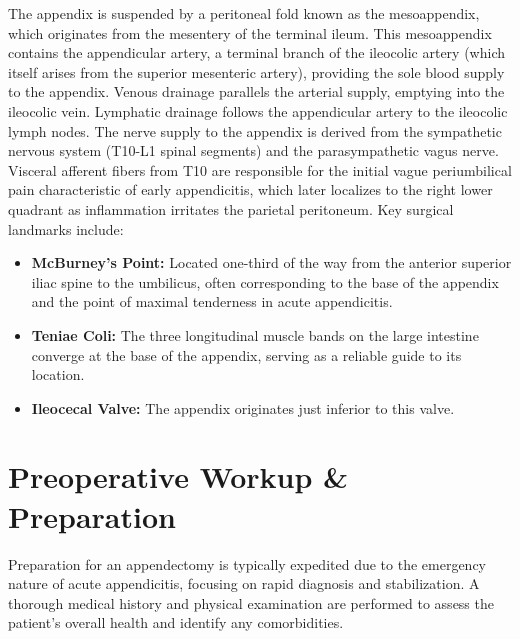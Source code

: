The appendix is suspended by a peritoneal fold known as the mesoappendix, which originates from the mesentery of the terminal ileum. This mesoappendix contains the appendicular artery, a terminal branch of the ileocolic artery (which itself arises from the superior mesenteric artery), providing the sole blood supply to the appendix. Venous drainage parallels the arterial supply, emptying into the ileocolic vein. Lymphatic drainage follows the appendicular artery to the ileocolic lymph nodes. The nerve supply to the appendix is derived from the sympathetic nervous system (T10-L1 spinal segments) and the parasympathetic vagus nerve. Visceral afferent fibers from T10 are responsible for the initial vague periumbilical pain characteristic of early appendicitis, which later localizes to the right lower quadrant as inflammation irritates the parietal peritoneum. Key surgical landmarks include:
\begin{itemize}
  \item \textbf{McBurney's Point:} Located one-third of the way from the anterior superior iliac spine to the umbilicus, often corresponding to the base of the appendix and the point of maximal tenderness in acute appendicitis.
  \item \textbf{Teniae Coli:} The three longitudinal muscle bands on the large intestine converge at the base of the appendix, serving as a reliable guide to its location.
  \item \textbf{Ileocecal Valve:} The appendix originates just inferior to this valve.
\end{itemize}

\section*{Preoperative Workup \& Preparation}
Preparation for an appendectomy is typically expedited due to the emergency nature of acute appendicitis, focusing on rapid diagnosis and stabilization. A thorough medical history and physical examination are performed to assess the patient's overall health and identify any comorbidities.

